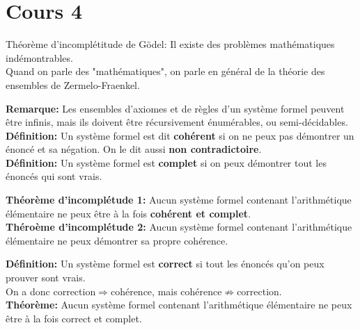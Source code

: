 \section{Cours 4}
Théorème d'incomplétitude de Gödel: Il existe des problèmes mathématiques indémontrables.\\
Quand on parle des "mathématiques", on parle en général de la théorie des ensembles de Zermelo-Fraenkel.

\textbf{Remarque:} Les ensembles d'axiomes et de règles d'un système formel peuvent être infinis, mais ils doivent être
récursivement énumérables, ou semi-décidables.\\
\textbf{Définition:} Un système formel est dit \textbf{cohérent} si on ne peux pas démontrer un énoncé et sa négation. 
On le dit aussi \textbf{non contradictoire}.\\
\textbf{Définition:} Un système formel est \textbf{complet} si on peux démontrer tout les énoncés qui sont vrais.

\textbf{Théorème d'incomplétude 1:} Aucun système formel contenant l'arithmétique élémentaire ne peux être à la fois
\textbf{cohérent et complet}.\\
\textbf{Théroème d'incomplétude 2:} Aucun système formel contenant l'arithmétique élémentaire ne peux démontrer sa
propre cohérence.

\textbf{Définition:} Un système formel est \textbf{correct} si tout les énoncés qu'on peux prouver sont vrais.\\
On a donc correction$\Rightarrow$cohérence, mais cohérence$\not\Rightarrow$correction.\\
\textbf{Théorème:} Aucun système formel contenant l'arithmétique élémentaire ne peux être à la fois correct et complet.
